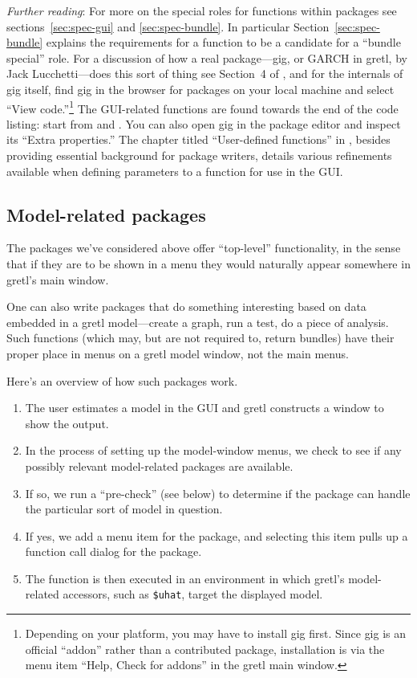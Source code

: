 \documentclass[oneside]{book}
\begin{document}
\textit{Further reading}: For more on the special roles for functions
within packages see sections~\ref{sec:spec-gui} and
\ref{sec:spec-bundle}. In particular Section~\ref{sec:spec-bundle}
explains the requirements for a function to be a candidate for a
``bundle special'' role. For a discussion of how a real
package---\textsf{gig}, or GARCH in gretl, by Jack Lucchetti---does
this sort of thing see Section~4 of \cite{addons-bundles}, and for the
internals of \textsf{gig} itself, find \textsf{gig} in the browser for
packages on your local machine and select ``View
code.''\footnote{Depending on your platform, you may have to install
  gig first. Since \textsf{gig} is an official ``addon'' rather than a
  contributed package, installation is via the menu item ``Help, Check
  for addons'' in the gretl main window.} The GUI-related functions
are found towards the end of the code listing: start from
 and . You can also
open \textsf{gig} in the package editor and inspect its ``Extra
properties.'' The chapter titled ``User-defined functions'' in
\cite{GUG}, besides providing essential background for package
writers, details various refinements available when defining
parameters to a function for use in the GUI.

\subsection{Model-related packages}

The packages we've considered above offer ``top-level'' functionality,
in the sense that if they are to be shown in a menu they would
naturally appear somewhere in gretl's main window.

One can also write packages that do something interesting based on
data embedded in a gretl model---create a graph, run a test, do a
piece of analysis. Such functions (which may, but are not required to,
return bundles) have their proper place in menus on a gretl model
window, not the main menus.

Here's an overview of how such packages work.

\begin{enumerate}
\item The user estimates a model in the GUI and gretl constructs a
  window to show the output.
\item In the process of setting up the model-window menus, we check to
  see if any possibly relevant model-related packages are available.
\item If so, we run a ``pre-check'' (see below) to determine
  if the package can handle the particular sort of model in
  question.
\item If yes, we add a menu item for the package, and selecting this
  item pulls up a function call dialog for the package.
\item The function is then executed in an environment in which gretl's
  model-related accessors, such as \verb|$uhat|, target the displayed
  model.%
\end{enumerate}
\end{document}
